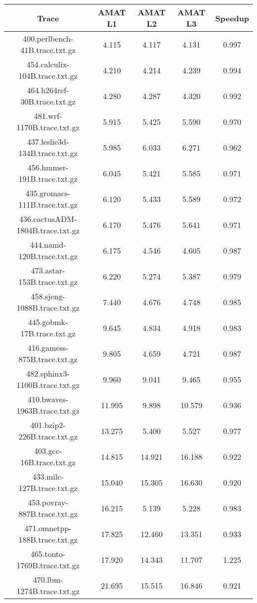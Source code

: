 \begin{table}[H]
\centering
\begin{tabular}{|c|c|c|c|c|}
\hline
Trace & AMAT L1 & AMAT L2 & AMAT L3 & Speedup\\
\hline
400.perlbench-41B.trace.txt.gz & 4.115 & 4.117 &  4.131 & 0.997\\\hline
454.calculix-104B.trace.txt.gz & 4.210 & 4.214 &  4.239 & 0.994\\\hline
464.h264ref-30B.trace.txt.gz & 4.280 & 4.287 &  4.320 & 0.992\\\hline
481.wrf-1170B.trace.txt.gz & 5.915 & 5.425 &  5.590 & 0.970\\\hline
437.leslie3d-134B.trace.txt.gz & 5.985 & 6.033 &  6.271 & 0.962\\\hline
456.hmmer-191B.trace.txt.gz & 6.045 & 5.421 &  5.585 & 0.971\\\hline
435.gromacs-111B.trace.txt.gz & 6.120 & 5.433 &  5.589 & 0.972\\\hline
436.cactusADM-1804B.trace.txt.gz & 6.170 & 5.476 &  5.641 & 0.971\\\hline
444.namd-120B.trace.txt.gz & 6.175 & 4.546 &  4.605 & 0.987\\\hline
473.astar-153B.trace.txt.gz & 6.220 & 5.274 &  5.387 & 0.979\\\hline
458.sjeng-1088B.trace.txt.gz & 7.440 & 4.676 &  4.748 & 0.985\\\hline
445.gobmk-17B.trace.txt.gz & 9.645 & 4.834 &  4.918 & 0.983\\\hline
416.gamess-875B.trace.txt.gz & 9.805 & 4.659 &  4.721 & 0.987\\\hline
482.sphinx3-1100B.trace.txt.gz & 9.960 & 9.041 &  9.465 & 0.955\\\hline
410.bwaves-1963B.trace.txt.gz & 11.995 & 9.898 &  10.579 & 0.936\\\hline
401.bzip2-226B.trace.txt.gz & 13.275 & 5.400 &  5.527 & 0.977\\\hline
403.gcc-16B.trace.txt.gz & 14.815 & 14.921 &  16.188 & 0.922\\\hline
433.milc-127B.trace.txt.gz & 15.040 & 15.305 &  16.630 & 0.920\\\hline
453.povray-887B.trace.txt.gz & 16.215 & 5.139 &  5.228 & 0.983\\\hline
471.omnetpp-188B.trace.txt.gz & 17.825 & 12.460 &  13.351 & 0.933\\\hline
465.tonto-1769B.trace.txt.gz & 17.920 & 14.343 &  11.707 & 1.225\\\hline
470.lbm-1274B.trace.txt.gz & 21.695 & 15.515 &  16.846 & 0.921\\\hline

\end{tabular}
\end{table}
